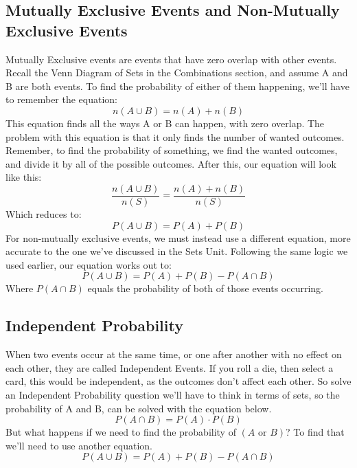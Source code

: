\documentclass[final,1p,12pt]{elsarticle}
\begin{document}
    \subsection{Mutually Exclusive Events and Non-Mutually Exclusive Events}
    Mutually Exclusive events are events that have zero overlap with other events.
    Recall the Venn Diagram of Sets in the Combinations section, and assume A and B are both events.
    To find the probability of either of them happening, we'll have to remember the equation:
    \begin{equation*}
        n(A\cup B) = n(A) + n(B)
    \end{equation*}
    This equation finds all the ways A or B can happen, with zero overlap.
    The problem with this equation is that it only finds the number of wanted outcomes.
    Remember, to find the probability of something, we find the wanted outcomes, and divide it by all of the possible outcomes.
    After this, our equation will look like this:
    \begin{equation*}
        \frac{n(A \cup B)}{n(S)} = \frac{n(A) + n(B)}{n(S)}
    \end{equation*}
    Which reduces to:
    \begin{equation*}
        P(A\cup B) = P(A) + P(B)
    \end{equation*}
    For non-mutually exclusive events, we must instead use a different equation, more accurate to the one we've discussed in the Sets Unit.
    Following the same logic we used earlier, our equation works out to:
    \begin{equation*}
        P(A\cup B) = P(A) + P(B) - P(A\cap B)
    \end{equation*}
    Where $P(A\cap B)$ equals the probability of both of those events occurring.

    \subsection{Independent Probability}
    When two events occur at the same time, or one after another with no effect on each other, they are called Independent Events.
    If you roll a die, then select a card, this would be independent, as the outcomes don't affect each other.
    So solve an Independent Probability question we'll have to think in terms of sets, so the probability of A and B, can be solved with the equation below.
    \begin{equation*}
        P(A\cap B) = P(A) \cdot P(B)
    \end{equation*}
        But what happens if we need to find the probability of $(A \mbox{ or } B)$?
        To find that we'll need to use another equation.
    \begin{equation*}
        P(A\cup B) = P(A) + P(B) - P(A\cap B)
    \end{equation*}
    
    

\clearpage\appendix

\end{document}
